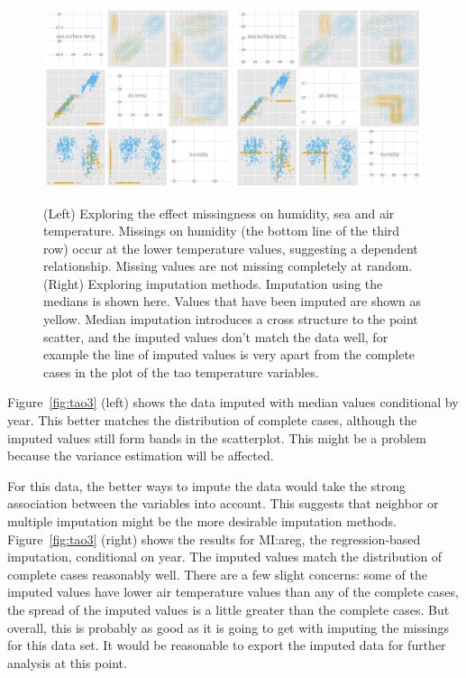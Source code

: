 \documentclass[article]{jss}
\begin{document}
\begin{figure}[htp]
\centerline{\includegraphics[width=0.49\textwidth]{graph/fig4-3-below10-uncondition}
\includegraphics[width=0.49\textwidth]{graph/fig4-1-median-uncondition}}
\caption{(Left) Exploring the effect missingness on humidity, sea and air temperature. Missings on humidity (the bottom line of the third row) occur at the lower temperature values, suggesting a dependent relationship. Missing values are not missing completely at random. (Right) Exploring imputation methods. Imputation using the medians is shown here. Values that have been imputed are shown as yellow. Median imputation introduces a cross structure to the point scatter, and the imputed values don't match the data well, for example the line of imputed values is very apart from the complete cases in the plot of the tao temperature variables.}
\label{fig:tao1}
\end{figure}


Figure~\ref{fig:tao3} (left) shows the data imputed with median values conditional by year. This better matches the distribution of complete cases, although the imputed values still form bands in the scatterplot. This might be a problem because the variance estimation will be affected. 

For this data, the better ways to impute the data would take the strong association between the variables into account. This suggests that neighbor or multiple imputation might be the more desirable imputation methods. Figure~\ref{fig:tao3} (right) shows the results for MI:areg, the regression-based imputation, conditional on year. The imputed values match the distribution of complete cases reasonably well. There are a few slight concerns: some of the imputed values have lower air temperature values than any of the complete cases, the spread of the imputed values is a little greater than the complete cases. But overall, this is probably as good as it is going to get with imputing the missings for this data set. It would be reasonable to export the imputed data for further analysis at this point.
\end{document}

